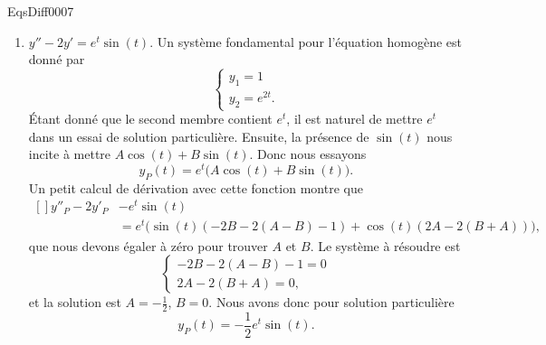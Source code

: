 
\begin{corrige}{EqsDiff0007}

\begin{enumerate}

\item
$y''-2y'= e^{t}\sin(t)$. Un système fondamental pour l'équation homogène est donné par
\begin{equation}
	\left\{
\begin{array}{ll}
y_1=1\\
y_2= e^{2t}.
\end{array}
\right.
\end{equation}
Étant donné que le second membre contient $e^t$, il est naturel de mettre $e^t$ dans un essai de solution particulière. Ensuite, la présence de $\sin(t)$ nous incite à mettre $A\cos(t)+B\sin(t)$. Donc nous essayons
\begin{equation}
		y_P(t)= e^{t}\big( A\cos(t)+B\sin(t) \big).
\end{equation}
Un petit calcul de dérivation avec cette fonction montre que
\begin{equation}
	\begin{aligned}[]
		y''_P-2y'_P&- e^{t}\sin(t)\\
			&=e^t\big( \sin(t)(-2B-2(A-B)-1)+\cos(t)(2A-2(B+A)) \big),
	\end{aligned}
\end{equation}
que nous devons égaler à zéro pour trouver $A$ et $B$. Le système à résoudre est
\begin{equation}
	\left\{
\begin{array}{ll}
-2B-2(A-B)-1=0\\
2A-2(B+A)=0,
\end{array}
\right.
\end{equation}
et la solution est $A=-\frac{ 1 }{2}$, $B=0$. Nous avons donc pour solution particulière
\begin{equation}
	y_P(t)=-\frac{ 1 }{2}e^t\sin(t).
\end{equation}


\end{enumerate}
\end{corrige}

